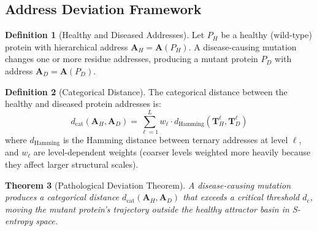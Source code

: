 \documentclass[11pt,twocolumn,a4paper]{article}
\newtheorem{theorem}{Theorem}[section]
\theoremstyle{definition}
\newtheorem{definition}[theorem]{Definition}
\theoremstyle{remark}
\begin{document}
\subsection{Address Deviation Framework}

\begin{definition}[Healthy and Diseased Addresses]
\label{def:disease}
Let $P_H$ be a healthy (wild-type) protein with hierarchical address $\mathbf{A}_H = \mathbf{A}(P_H)$. A disease-causing mutation changes one or more residue addresses, producing a mutant protein $P_D$ with address $\mathbf{A}_D = \mathbf{A}(P_D)$.
\end{definition}

\begin{definition}[Categorical Distance]
\label{def:cat_distance}
The categorical distance between the healthy and diseased protein addresses is:
\begin{equation}
d_{\mathrm{cat}}(\mathbf{A}_H, \mathbf{A}_D) = \sum_{\ell=1}^{L} w_\ell \cdot d_{\mathrm{Hamming}}(\mathbf{T}^\ell_H, \mathbf{T}^\ell_D)
\label{eq:cat_distance}
\end{equation}
where $d_{\mathrm{Hamming}}$ is the Hamming distance between ternary addresses at level $\ell$, and $w_\ell$ are level-dependent weights (coarser levels weighted more heavily because they affect larger structural scales).
\end{definition}

\begin{theorem}[Pathological Deviation Theorem]
\label{thm:pathological}
A disease-causing mutation produces a categorical distance $d_{\mathrm{cat}}(\mathbf{A}_H, \mathbf{A}_D)$ that exceeds a critical threshold $d_c$, moving the mutant protein's trajectory outside the healthy attractor basin in S-entropy space.
\end{theorem}
\end{document}
